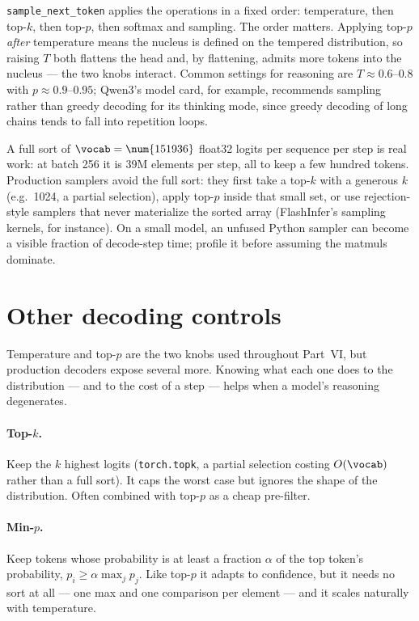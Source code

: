 \texttt{sample\_next\_token} applies the operations in a fixed order: temperature, then top-$k$,
then top-$p$, then softmax and sampling. The order matters. Applying top-$p$ \emph{after}
temperature means the nucleus is defined on the tempered distribution, so raising $T$ both flattens
the head and, by flattening, admits more tokens into the nucleus --- the two knobs interact. Common
settings for reasoning are $T \approx 0.6$--$0.8$ with $p \approx 0.9$--$0.95$; Qwen3's model card,
for example, recommends sampling rather than greedy decoding for its thinking mode, since greedy
decoding of long chains tends to fall into repetition loops.

\begin{systemslens}
A full sort of $\vocab = \num{151936}$ float32 logits per sequence per step is real work: at batch
256 it is 39M elements per step, all to keep a few hundred tokens. Production samplers avoid the
full sort: they first take a top-$k$ with a generous $k$ (e.g.\ 1024, a partial selection), apply
top-$p$ inside that small set, or use rejection-style samplers that never materialize the sorted
array (FlashInfer's sampling kernels, for instance). On a small model, an unfused Python sampler
can become a visible fraction of decode-step time; profile it before assuming the matmuls dominate.
\end{systemslens}


\section{Other decoding controls}\label{sec:scaling:otherdecoding}

Temperature and top-$p$ are the two knobs used throughout Part~VI, but production decoders expose
several more. Knowing what each one does to the distribution --- and to the cost of a step --- helps
when a model's reasoning degenerates.

\paragraph{Top-$k$.} Keep the $k$ highest logits (\texttt{torch.topk}, a partial selection costing
$O(\vocab)$ rather than a full sort). It caps the worst case but ignores the shape of the
distribution. Often combined with top-$p$ as a cheap pre-filter.

\paragraph{Min-$p$.} Keep tokens whose probability is at least a fraction $\alpha$ of the top token's
probability, $p_i \ge \alpha \max_j p_j$. Like top-$p$ it adapts to confidence, but it needs no sort
at all --- one max and one comparison per element --- and it scales naturally with temperature.

